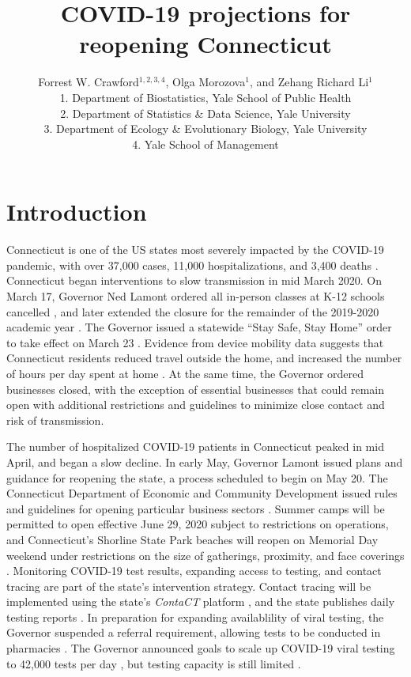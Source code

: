 \documentclass[11pt]{article}
\title{COVID-19 projections for reopening Connecticut}
\author{
  Forrest W. Crawford$^{1,2,3,4}$,
  Olga Morozova$^{1}$, 
  and
  Zehang Richard Li$^1$
  \\[1em]
\small 1. Department of Biostatistics, Yale School of Public Health \\
\small 2. Department of Statistics \& Data Science, Yale University \\
\small 3. Department of Ecology \& Evolutionary Biology, Yale University \\
\small 4. Yale School of Management }
\begin{document}
\maketitle



\section*{Introduction}

Connecticut is one of the US states most severely impacted by the COVID-19 pandemic, with over 37,000 cases, 11,000 hospitalizations, and 3,400 deaths \citep{nyt2020Connecticut,atlantic2020data}.  Connecticut began interventions to slow transmission in mid March 2020.  On March 17, Governor Ned Lamont ordered all in-person classes at K-12 schools cancelled \citep{lamont2020exec7c}, and later extended the closure for the remainder of the 2019-2020 academic year \citep{lamont2020exec7l,lamont2020exec7x,lamont2020exec7ii}.  The Governor issued a statewide ``Stay Safe, Stay Home'' order to take effect on March 23 \citep{lamont2020exec7h}.  Evidence from device mobility data suggests that Connecticut residents reduced travel outside the home, and increased the number of hours per day spent at home \citep{google2020covid,facebook2020covid}. At the same time, the Governor ordered businesses closed, with the exception of essential businesses that could remain open with additional restrictions and guidelines to minimize close contact and risk of transmission. 



The number of hospitalized COVID-19 patients in Connecticut peaked in mid April, and began a slow decline.  In early May, Governor Lamont issued plans and guidance for reopening the state, a process scheduled to begin on May 20. The Connecticut Department of Economic and Community Development issued rules and guidelines for opening particular business sectors \citep{decd2020coronavirus}. Summer camps will be permitted to open effective June 29, 2020 subject to restrictions on operations, and Connecticut's Shorline State Park beaches will reopen on Memorial Day weekend under restrictions on the size of gatherings, proximity, and face coverings \citep{ct2020parks}.  Monitoring COVID-19 test results, expanding access to testing, and contact tracing are part of the state's intervention strategy.  Contact tracing will be implemented using the state's \emph{ContaCT} platform \citep{ct2020contact}, and the state publishes daily testing reports \citep[e.g.][]{ct2020testing}. In preparation for expanding availablility of viral testing, the Governor suspended a referral requirement, allowing tests to be conducted in pharmacies \citep{lamont2020suspension,lamont2020exec7kk}. The Governor announced goals to scale up COVID-19 viral testing to 42,000 tests per day \citep{phaneuf2020lamont}, but testing capacity is still limited \cite{thomas2020surge}. 
\end{document}
